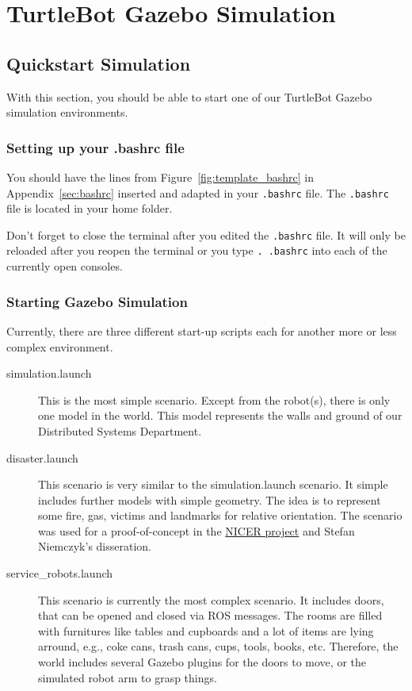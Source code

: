 \chapter{TurtleBot Gazebo Simulation}
\label{chap:TurtleBotGazeboSimulation}

\section{Quickstart Simulation}
\label{sec:QuickstartSimulation}

With this section, you should be able to start one of our TurtleBot Gazebo simulation environments. 

\subsection{Setting up your .bashrc file}
\label{ssec:bashrc}

You should have the lines from Figure~\ref{fig:template_bashrc} in Appendix~\ref{sec:bashrc} inserted and adapted in your \verb$.bashrc$ file. The \verb$.bashrc$ file is located in your home folder. 

Don't forget to close the terminal after you edited the \verb$.bashrc$ file. It will only be reloaded after you reopen the terminal or you type \verb$. .bashrc$ into each of the currently open consoles.

\subsection{Starting Gazebo Simulation}
\label{ssec:StartSimulation}

Currently, there are three different start-up scripts \textemdash each for another more or less complex environment. 

\begin{description}
  \item[simulation.launch] This is the most simple scenario. Except from the robot(s), there is only one model in the world. This model represents the walls and ground of our Distributed Systems Department.
  \item[disaster.launch] This scenario is very similar to the simulation.launch scenario. It simple includes further models with simple geometry. The idea is to represent some fire, gas, victims and landmarks for relative orientation. The scenario was used for a proof-of-concept in the \href{http://www.uni-kassel.de/eecs/fachgebiete/vs/research/nicer.html}{NICER project} and Stefan Niemczyk's disseration. 
  \item[service\_robots.launch] This scenario is currently the most complex scenario. It includes doors, that can be opened and closed via ROS messages. The rooms are filled with furnitures like tables and cupboards and a lot of items are lying arround, e.g., coke cans, trash cans, cups, tools, books, etc. Therefore, the world includes several Gazebo plugins for the doors to move, or the simulated robot arm to grasp things.
\end{description}


